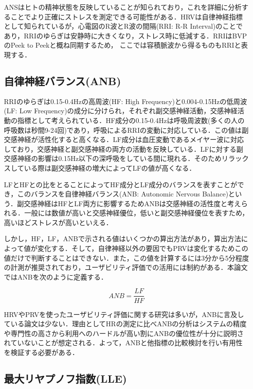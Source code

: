 ANSはヒトの精神状態を反映していることが知られており，これを詳細に分析することでより正確にストレスを測定できる可能性がある．HRVは自律神経指標として知られているが，心電図のR波とR波の間隔(RRI: R-R Interval)のことであり，RRIのゆらぎは安静時に大きくなり，ストレス時に低減する\cite{nakagawa}．RRIはBVPのPeek to Peekと概ね同期するため，
ここでは容積脈波から得るものもRRIと表現する．

\subsection{自律神経バランス(ANB)}

RRIのゆらぎは0.15-0.4Hzの高周波(HF: High Frequency)と0.004-0.15Hzの低周波(LF: Low Frequency)の成分に分けられ，それぞれ副交感神経活動，交感神経活動の指標として考えられている\cite{yamaguchi}．HF成分の0.15-0.4Hzは呼吸周波数(多くの人の呼吸数は秒間9-24回)であり，呼吸によるRRIの変動に対応している．この値は副交感神経が活性化すると高くなる\cite{lehrer}．LF成分は血圧変動であるメイヤー波に対応しており，交感神経と副交感神経の両方の活動を反映している．LFに対する副交感神経の影響は0.15Hz以下の深呼吸をしている間に現れる．そのためリラックスしている際は副交感神経の増大によってLFの値が高くなる\cite{trytech}．

LFとHFとの比をとることによってHF成分とLF成分のバランスを表すことができ，このバランスを自律神経バランス(ANB: Autonomic Nervous Balance)という．副交感神経はHFとLF両方に影響するためANBは交感神経の活性度と考えられる\cite{yamaguchi}．一般には数値が高いと交感神経優位，低いと副交感神経優位を表すため，高いほどストレスが高いといえる．

しかし，HF，LF，ANBで示される値はいくつかの算出方法があり，算出方法によって値が変化する．そして，自律神経以外の要因でもPRVは変化するためこの値だけで判断することはできない．また，この値を計算するには3分から5分程度の計測が推奨されており\cite{nakagawa}，ユーザビリティ評価での活用には制約がある．本論文ではANBを次のように定義する．

\begin{equation}
ANB= \frac{LF}{HF} 
\end{equation}

HRVやPRVを使ったユーザビリティ評価に関する研究は多いが，ANBに言及している論文は少ない\cite{lei2020}\cite{wollmann}．理由としてHRの測定に比べANBの分析はシステムの精度や専門性の高さから利用へのハードルが高い割にANBの優位性が十分に説明されていないことが想定される．よって，ANBと他指標の比較検討を行い有用性を検証する必要がある．

\subsection{最大リヤプノフ指数(LLE)}

